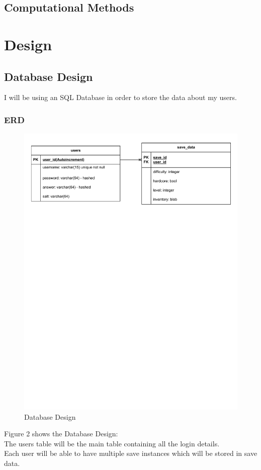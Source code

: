 \documentclass{article}
\begin{document}
        \subsection{Computational Methods}
\newpage
\pagestyle{plain}
\section{Design}
        \subsection{Database Design}
        I will be using an SQL Database in order to store the data about my users.\\
        \subsubsection{ERD}
        \begin{figure}[H]
                \centering
                \includegraphics[width=\textwidth, trim = 0 575 0 25, clip]{images/design/Database_Design.pdf}
                \caption{Database Design}
                \label{fig:ie_1}
        \end{figure}
        Figure 2 shows the Database Design:\\
        The users table will be the main table containing all the login details.\\
        Each user will be able to have multiple save instances which will be stored in save data.\\
\end{document}
